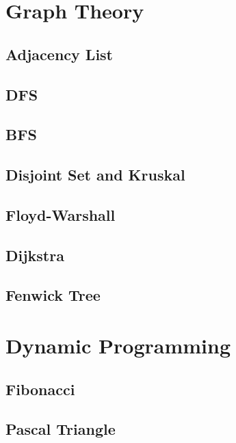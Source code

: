 \section{Graph Theory}
        \subsection{Adjacency List}
                
        \subsection{DFS}
                
        \subsection{BFS}
                
        \subsection{Disjoint Set and Kruskal}
                
        \subsection{Floyd-Warshall}
                
        \subsection{Dijkstra}
                
        \subsection{Fenwick Tree}
                

\section{Dynamic Programming}
    \subsection{Fibonacci}
            
    \subsection{Pascal Triangle}
        
